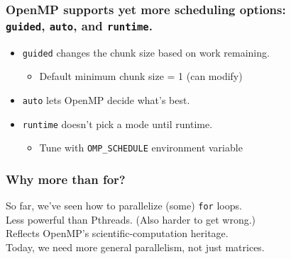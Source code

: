 \begin{frame}[fragile]
  \frametitle{OpenMP supports yet more scheduling options: \\
{\tt guided}, {\tt auto}, and {\tt runtime}.}

  \begin{changemargin}{1.5cm}
\large
      
  \begin{itemize}
    \item {\tt guided} changes the chunk size based on work
          remaining.
          
      \begin{itemize}
        \item Default minimum chunk size = 1 (can modify)
      \end{itemize}
    \item {\tt auto} lets OpenMP decide what's best.
    \item {\tt runtime} doesn't pick a mode until runtime.
      \begin{itemize}
        \item Tune with \verb+OMP_SCHEDULE+ environment variable
      \end{itemize}
  \end{itemize}
  \end{changemargin}

\end{frame}


\begin{frame}[fragile]
  \frametitle{Why more than for?}

\large
  
  \begin{changemargin}{.5cm}
  So far, we've seen how to parallelize (some) {\tt for} loops.\\[1em]

  Less powerful than Pthreads. (Also harder to get wrong.)\\[1em]

  Reflects OpenMP's scientific-computation heritage.\\[1em]

  Today, we need more general parallelism, not just matrices.
  \end{changemargin}


\end{frame}

